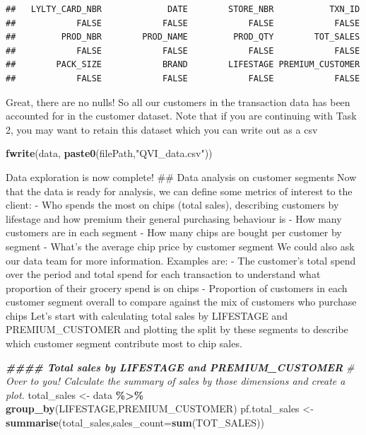 \documentclass[
]{article}
\newenvironment{Shaded}{\begin{snugshade}}{\end{snugshade}}
\newcommand{\AttributeTok}[1]{\textcolor[rgb]{0.13,0.29,0.53}{#1}}
\newcommand{\CommentTok}[1]{\textcolor[rgb]{0.56,0.35,0.01}{\textit{#1}}}
\newcommand{\DocumentationTok}[1]{\textcolor[rgb]{0.56,0.35,0.01}{\textbf{\textit{#1}}}}
\newcommand{\FunctionTok}[1]{\textcolor[rgb]{0.13,0.29,0.53}{\textbf{#1}}}
\newcommand{\NormalTok}[1]{#1}
\newcommand{\OtherTok}[1]{\textcolor[rgb]{0.56,0.35,0.01}{#1}}
\newcommand{\SpecialCharTok}[1]{\textcolor[rgb]{0.81,0.36,0.00}{\textbf{#1}}}
\newcommand{\StringTok}[1]{\textcolor[rgb]{0.31,0.60,0.02}{#1}}
\begin{document}
\begin{verbatim}
##   LYLTY_CARD_NBR             DATE        STORE_NBR           TXN_ID 
##            FALSE            FALSE            FALSE            FALSE 
##         PROD_NBR        PROD_NAME         PROD_QTY        TOT_SALES 
##            FALSE            FALSE            FALSE            FALSE 
##        PACK_SIZE            BRAND        LIFESTAGE PREMIUM_CUSTOMER 
##            FALSE            FALSE            FALSE            FALSE
\end{verbatim}

Great, there are no nulls! So all our customers in the transaction data
has been accounted for in the customer dataset. Note that if you are
continuing with Task 2, you may want to retain this dataset which you
can write out as a csv

\begin{Shaded}
\begin{Highlighting}[]
\FunctionTok{fwrite}\NormalTok{(data, }\FunctionTok{paste0}\NormalTok{(filePath,}\StringTok{"QVI\_data.csv"}\NormalTok{))}
\end{Highlighting}
\end{Shaded}

Data exploration is now complete! \#\# Data analysis on customer
segments Now that the data is ready for analysis, we can define some
metrics of interest to the client: - Who spends the most on chips (total
sales), describing customers by lifestage and how premium their general
purchasing behaviour is - How many customers are in each segment - How
many chips are bought per customer by segment - What's the average chip
price by customer segment We could also ask our data team for more
information. Examples are: - The customer's total spend over the period
and total spend for each transaction to understand what proportion of
their grocery spend is on chips - Proportion of customers in each
customer segment overall to compare against the mix of customers who
purchase chips Let's start with calculating total sales by LIFESTAGE and
PREMIUM\_CUSTOMER and plotting the split by these segments to describe
which customer segment contribute most to chip sales.

\begin{Shaded}
\begin{Highlighting}[]
\DocumentationTok{\#\#\#\# Total sales by LIFESTAGE and PREMIUM\_CUSTOMER}
\CommentTok{\# Over to you! Calculate the summary of sales by those dimensions and create a plot.}
\NormalTok{total\_sales }\OtherTok{\textless{}{-}}\NormalTok{ data }\SpecialCharTok{\%\textgreater{}\%} \FunctionTok{group\_by}\NormalTok{(LIFESTAGE,PREMIUM\_CUSTOMER)}
\NormalTok{pf.total\_sales }\OtherTok{\textless{}{-}} \FunctionTok{summarise}\NormalTok{(total\_sales,}\AttributeTok{sales\_count=}\FunctionTok{sum}\NormalTok{(TOT\_SALES))}
\end{Highlighting}
\end{Shaded}
\end{document}
